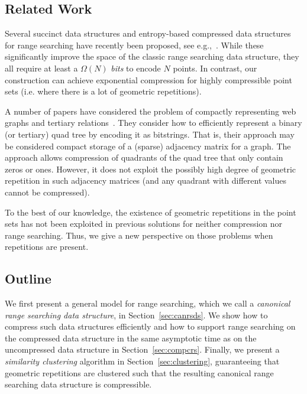 \subsection*{Related Work} 
Several succinct data structures and entropy-based compressed data structures for range searching have recently been proposed, see e.g.,~\cite{makinen2007rank, bose2009succinct, barbay2010compact, farzan2014entropy}. While these significantly improve the space of the classic range searching data structure, they all require at least a $\Omega(N)$ \emph{bits} to encode $N$ points. In contrast, our construction can achieve exponential compression for highly compressible point sets (i.e. where there is a lot of geometric repetitions). 

A number of papers have considered the problem of compactly representing web graphs and tertiary relations~\cite{brisaboa2009k2, brisaboaainterleaved, de2013compact}. They consider how to efficiently represent a binary (or tertiary) quad tree by encoding it as bitstrings. That is, their approach may be considered compact storage of a (sparse) adjacency matrix for a graph. The approach allows compression of quadrants of the quad tree that only contain zeros or ones. However, it does not exploit the possibly high degree of geometric repetition in such adjacency matrices (and any quadrant with different values cannot be compressed).

To the best of our knowledge, the existence of geometric repetitions in the point sets has not been exploited in previous solutions for neither compression nor range searching. Thus, we give a new perspective on those problems when repetitions are present. 

\subsection*{Outline}
We first present a general model for range searching, which we call a \emph{canonical range searching data structure}, in Section~\ref{sec:canrsds}. We show how to compress such data structures efficiently and how to support range searching on the compressed data structure in the same asymptotic time as on the uncompressed data structure in Section~\ref{sec:compcrs}. Finally, we present a \emph{similarity clustering} algorithm in Section~\ref{sec:clustering}, guaranteeing that geometric repetitions are clustered such that the resulting canonical range searching data structure is compressible.


